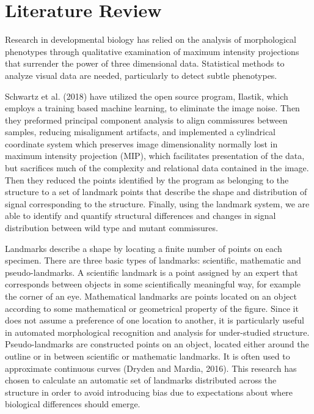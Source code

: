 \documentclass[10pt,letterpaper]{article}
\begin{document}
\section{Literature Review}\label{literature-review}

Research in developmental biology has relied on the analysis of
morphological phenotypes through qualitative examination of maximum
intensity projections that surrender the power of three dimensional
data. Statistical methods to analyze visual data are needed,
particularly to detect subtle phenotypes.

Schwartz et al. (2018) have utilized the open source program, Ilastik,
which employs a training based machine learning, to eliminate the image
noise. Then they preformed principal component analysis to align
commissures between samples, reducing misalignment artifacts, and
implemented a cylindrical coordinate system which preserves image
dimensionality normally lost in maximum intensity projection (MIP),
which facilitates presentation of the data, but sacrifices much of the
complexity and relational data contained in the image. Then they reduced
the points identified by the program as belonging to the structure to a
set of landmark points that describe the shape and distribution of
signal corresponding to the structure. Finally, using the landmark
system, we are able to identify and quantify structural differences and
changes in signal distribution between wild type and mutant commissures.

Landmarks describe a shape by locating a finite number of points on each
specimen. There are three basic types of landmarks: scientific,
mathematic and pseudo-landmarks. A scientific landmark is a point
assigned by an expert that corresponds between objects in some
scientifically meaningful way, for example the corner of an eye.
Mathematical landmarks are points located on an object according to some
mathematical or geometrical property of the figure. Since it does not
assume a preference of one location to another, it is particularly
useful in automated morphological recognition and analysis for
under-studied structure. Pseudo-landmarks are constructed points on an
object, located either around the outline or in between scientific or
mathematic landmarks. It is often used to approximate continuous curves
(Dryden and Mardia, 2016). This research has chosen to calculate an
automatic set of landmarks distributed across the structure in order to
avoid introducing bias due to expectations about where biological
differences should emerge.
\end{document}
